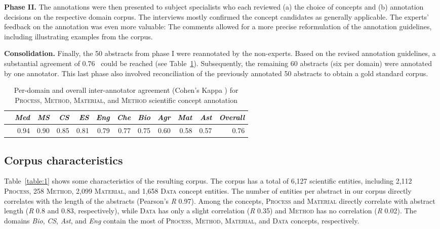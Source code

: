 \documentclass[runningheads]{llncs}
\begin{document}
\textbf{Phase II.} The annotations were then presented to subject specialists who each reviewed (a) the choice of concepts and (b) annotation decisions on the respective domain corpus. The interviews mostly confirmed the concept candidates as generally applicable. 
The experts' feedback on the annotation was even more valuable: The comments allowed for a more precise reformulation of the annotation guidelines, including illustrating examples from the corpus. 

\textbf{Consolidation. }
Finally, the 50 abstracts from phase I were reannotated by the non-experts. 
Based on the revised annotation guidelines,  
a substantial agreement of 0.76~ could be reached (see Table~\ref{table:2}).
Subsequently, the remaining 60 abstracts (six per domain) were annotated by one annotator. 
This last phase also involved reconciliation of the previously annotated 50 abstracts to obtain a gold standard corpus.

\begin{table}[htb]
\centering
\caption{Per-domain and overall inter-annotator agreement (Cohen's Kappa ) for \textsc{Process}, \textsc{Method}, \textsc{Material}, and \textsc{Method} scientific concept annotation}
\begin{tabular}{l|rrrrrrrrrr|r}
	& \textit{Med}	&\textit{MS}	&\textit{CS}	&\textit{ES}	&\textit{Eng}	&\textit{Che}	&\textit{Bio}	&\textit{Agr}	&\textit{Mat}	&\textit{Ast} &\textit{Overall} \\ \hline
	& 0.94 & 0.90 & 0.85 & 0.81 & 0.79 & 0.77 & 0.75 & 0.60 & 0.58 & 0.57 & 0.76 
\end{tabular}
\label{table:2}
\end{table}



\subsection{Corpus characteristics}
Table~\ref{table:1} shows some characteristics of the resulting corpus. 
The corpus has a total of 6,127 scientific entities, including 2,112 \textsc{Process}, 258 \textsc{Method}, 2,099 \textsc{Material}, and 1,658 \textsc{Data} concept entities. The number of entities per abstract in our corpus directly correlates with the length of the abstracts (Pearson's \textit{R} 0.97). 
Among the concepts, \textsc{Process} and \textsc{Material} directly correlate with abstract length (\textit{R} 0.8 and 0.83, respectively), while \textsc{Data} has only a slight correlation (\textit{R} 0.35) and \textsc{Method} has no correlation (\textit{R} 0.02). 
The domains \textit{Bio}, \textit{CS}, \textit{Ast}, and \textit{Eng} contain the most of \textsc{Process}, \textsc{Method}, \textsc{Material}, and \textsc{Data} concepts, respectively.
\end{document}
